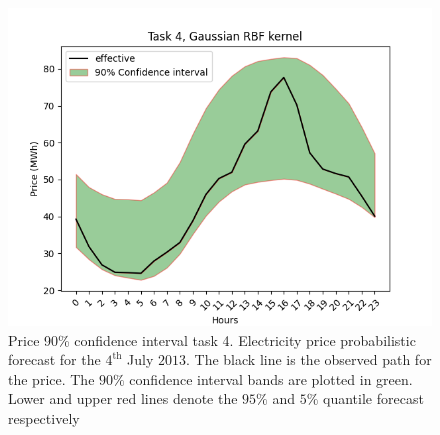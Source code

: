 
\begin{figure}[!ht]
    \centering
    \includegraphics[width=\linewidth]{images/price_task_4_gaussian_rbf.png}
    \caption[Prediction price track task 4, Gaussian RBF kernel]{Price 90\% confidence interval task 4. Electricity price probabilistic forecast for the $4^{\text{th}}$ July $2013$. The black line is the observed path for the price. The $90\%$ confidence interval bands are plotted in green. Lower and upper red lines denote the $95\%$ and $5\%$ quantile forecast respectively}
    \label{fig:price_task_4_gaussian_rbf}
\end{figure}

